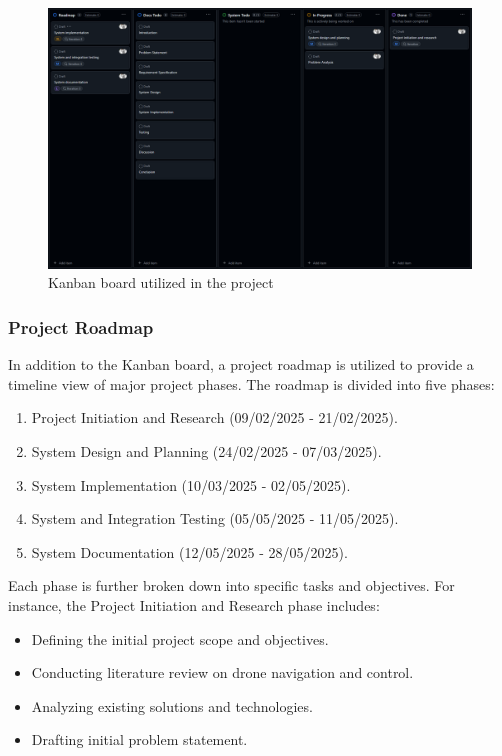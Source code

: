 \FloatBarrier

\begin{figure}
    \centering
    \includegraphics[width=1\linewidth]{7. Figures/Methodology/Kanbanboard.png}
    \caption{Kanban board utilized in the project}
    \label{fig:kanban-board}
\end{figure}

\subsubsection{Project Roadmap}

In addition to the Kanban board, a project roadmap is utilized to provide a timeline view of major project phases. The roadmap is divided into five phases:

\begin{enumerate}
    \item Project Initiation and Research (09/02/2025 - 21/02/2025).
    \item System Design and Planning (24/02/2025 - 07/03/2025).
    \item System Implementation (10/03/2025 - 02/05/2025).
    \item System and Integration Testing (05/05/2025 - 11/05/2025).
    \item System Documentation (12/05/2025 - 28/05/2025).
\end{enumerate}

Each phase is further broken down into specific tasks and objectives. For instance, the Project Initiation and Research phase includes:

\begin{itemize}
    \item Defining the initial project scope and objectives.
    \item Conducting literature review on drone navigation and control.
    \item Analyzing existing solutions and technologies.
    \item Drafting initial problem statement.
\end{itemize}


